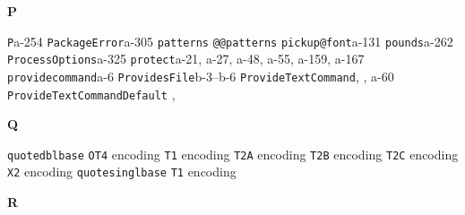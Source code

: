 \documentclass[twoside]{ltxdoc}
\makeatletter
\renewenvironment{theindex}{%
   \@restonecoltrue
   \if@twocolumn\@restonecolfalse\fi
   \columnseprule \z@
   \columnsep 35\p@
   \twocolumn[\index@prologue]%
   \IndexParms
   \let\item\@idxitem
   \ignorespaces
}{\if@restonecol\onecolumn\else\clearpage\fi}
\makeatother
\begin{document}
\begin{theindex}
  \indexspace
{\bfseries\hfil P\hfil}\nopagebreak

  \item \texttt  {P}\pfill a-254
  \item \texttt  {PackageError}\pfill a-305
  \item \texttt  {patterns}\pfill {}
  \item \texttt  {@@patterns}\pfill {}
  \item \texttt  {pickup@font}\pfill a-131
  \item \texttt  {pounds}\pfill a-262
  \item \texttt  {ProcessOptions}\pfill a-325
  \item \texttt  {protect}\pfill a-21, a-27, a-48, a-55, 
                a-159, a-167
  \item \texttt  {providecommand}\pfill a-6
  \item \texttt  {ProvidesFile}\pfill b-3--b-6
  \item \texttt  {ProvideTextCommand}\pfill {}, 
                , a-60
  \item \texttt  {ProvideTextCommandDefault}\pfill 
                , 

  \indexspace
{\bfseries\hfil Q\hfil}\nopagebreak

  \item \texttt  {quotedblbase}\efill 
    \subitem \texttt  {OT4} encoding\pfill {}
    \subitem \texttt  {T1} encoding\pfill {}
    \subitem \texttt  {T2A} encoding\pfill {}
    \subitem \texttt  {T2B} encoding\pfill {}
    \subitem \texttt  {T2C} encoding\pfill {}
    \subitem \texttt  {X2} encoding\pfill {}
  \item \texttt  {quotesinglbase}\efill 
    \subitem \texttt  {T1} encoding\pfill {}

  \indexspace
{\bfseries\hfil R\hfil}\nopagebreak


\end{theindex}
\end{document}

